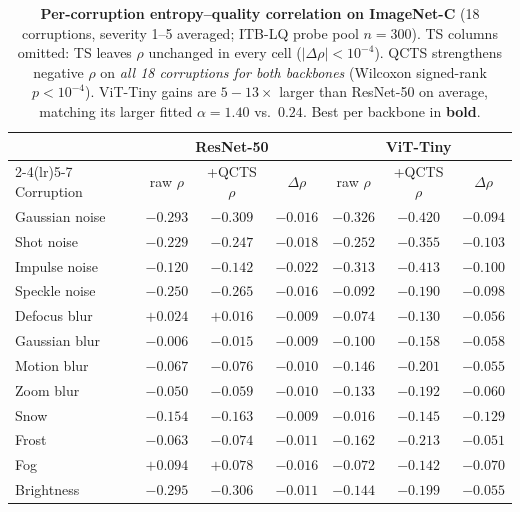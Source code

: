 \begin{table}[!t]
\centering
\caption{\textbf{Per-corruption entropy--quality correlation on ImageNet-C} (18 corruptions, severity 1--5 averaged; ITB-LQ probe pool $n{=}300$). TS columns omitted: TS leaves $\rho$ unchanged in every cell ($|\Delta\rho|<10^{-4}$). QCTS strengthens negative $\rho$ on \emph{all 18 corruptions for both backbones} (Wilcoxon signed-rank $p<10^{-4}$). ViT-Tiny gains are $5{-}13\times$ larger than ResNet-50 on average, matching its larger fitted $\alpha{=}1.40$ vs.\ $0.24$. Best per backbone in \textbf{bold}.}
\label{tab:imagenetc}
\vspace{4pt}
\footnotesize
\setlength{\tabcolsep}{4pt}
\renewcommand{\arraystretch}{1.05}
\begin{tabular}{lcccccc}
\toprule
& \multicolumn{3}{c}{ResNet-50} & \multicolumn{3}{c}{ViT-Tiny} \\
\cmidrule(lr){2-4}\cmidrule(lr){5-7}
Corruption & raw $\rho$ & +QCTS $\rho$ & $\Delta\rho$ & raw $\rho$ & +QCTS $\rho$ & $\Delta\rho$ \\
\midrule
Gaussian noise   & $-0.293$ & $\mathbf{-0.309}$ & $-0.016$ & $-0.326$ & $\mathbf{-0.420}$ & $-0.094$ \\
Shot noise       & $-0.229$ & $-0.247$ & $-0.018$ & $-0.252$ & $-0.355$ & $-0.103$ \\
Impulse noise    & $-0.120$ & $-0.142$ & $-0.022$ & $-0.313$ & $-0.413$ & $-0.100$ \\
Speckle noise    & $-0.250$ & $-0.265$ & $-0.016$ & $-0.092$ & $-0.190$ & $-0.098$ \\
Defocus blur     & $+0.024$ & $+0.016$ & $-0.009$ & $-0.074$ & $-0.130$ & $-0.056$ \\
Gaussian blur    & $-0.006$ & $-0.015$ & $-0.009$ & $-0.100$ & $-0.158$ & $-0.058$ \\
Motion blur      & $-0.067$ & $-0.076$ & $-0.010$ & $-0.146$ & $-0.201$ & $-0.055$ \\
Zoom blur        & $-0.050$ & $-0.059$ & $-0.010$ & $-0.133$ & $-0.192$ & $-0.060$ \\
Snow             & $-0.154$ & $-0.163$ & $-0.009$ & $-0.016$ & $-0.145$ & $\mathbf{-0.129}$ \\
Frost            & $-0.063$ & $-0.074$ & $-0.011$ & $-0.162$ & $-0.213$ & $-0.051$ \\
Fog              & $+0.094$ & $+0.078$ & $-0.016$ & $-0.072$ & $-0.142$ & $-0.070$ \\
Brightness       & $-0.295$ & $-0.306$ & $-0.011$ & $-0.144$ & $-0.199$ & $-0.055$ \\

\end{tabular}
\end{table}
